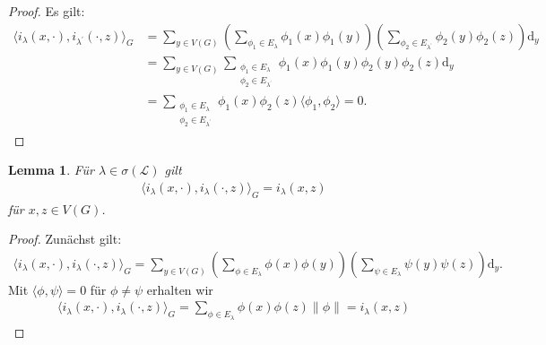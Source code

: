 \documentclass[headsepline,11pt]{scrbook}
\newtheorem{lem}{Lemma}[section]
\theoremstyle{definition}
\begin{document}
\begin{proof}
	Es gilt:
	\begin{align*}
	\langle i_\lambda(x,\cdot), i_{\lambda^\prime}(\cdot,z) \rangle_G
	&=
	\sum \limits_{y \in V(G)}
	\left( \sum \limits_{\phi_1 \in E_\lambda} \phi_1(x) \phi_1(y) \right)
	\left(\sum \limits_{\phi_2 \in E_{\lambda^\prime}} \phi_2(y) \phi_2(z)\right) \mathrm{d}_y\\
	&=
	\sum \limits_{y \in V(G) }
	\sum \limits_{\substack{\phi_1 \in E_\lambda\\
					\phi_2 \in E_{\lambda^\prime}
			}}
			\phi_1(x) \phi_1(y) \phi_2(y) \phi_2(z)
			\mathrm{d}_y\\
	&=
	\sum \limits_{\substack{\phi_1 \in E_\lambda\\
			\phi_2 \in E_{\lambda^\prime}
			}}
		\phi_1(x) \phi_2(z) \langle \phi_1,\phi_2 \rangle
	= 0.	
	\end{align*}
\end{proof}

\begin{lem}\label{th:projection_kernel_same_eigenvalues}
	F\"ur $ \lambda \in \sigma(\mathcal{L}) $ gilt
	\begin{align}\label{eq:projection_kernel_same_eigenvalues}
	\langle i_\lambda(x,\cdot) , i_\lambda(\cdot,z) \rangle_G
	=
	i_\lambda(x,z)
	\end{align}
	f\"ur $ x,z \in V(G) $.
	
\end{lem}

\begin{proof}
	Zun\"achst gilt: 
	\begin{align*}
	\langle i_\lambda(x, \cdot), i_\lambda(\cdot, z) \rangle_G
	=
	\sum \limits_{y \in V(G)} 
	\left( \sum \limits_{\phi \in E_\lambda} \phi(x) \phi(y) \right)
	\left(\sum \limits_{\psi \in E_\lambda} \psi(y) \psi(z)\right) \mathrm{d}_y.
	\end{align*}
	Mit $ \langle \phi , \psi \rangle = 0  $ f\"ur $ \phi \neq \psi $ erhalten wir
	\begin{align*}
	\langle i_\lambda(x, \cdot), i_\lambda(\cdot, z) \rangle_G
	=
	\sum \limits_{\phi \in E_\lambda} 
	\phi(x)\phi(z) \| \phi\|
	=
	i_\lambda(x,z)
	\end{align*}
\end{proof}
\end{document}

